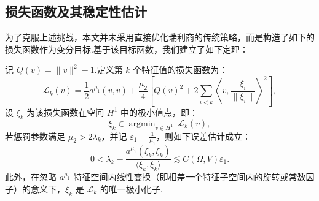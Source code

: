 \subsection{损失函数及其稳定性估计}
为了克服上述挑战，本文并未采用直接优化瑞利商的传统策略，而是构造了如下的损失函数作为变分目标.基于该目标函数，我们建立了如下定理：

\begin{theorem}\label{th:3.1}
记 $Q(v)=\|v\|^{2}-1$.定义第 $k$ 个特征值的损失函数为：
\begin{equation}\label{eq:conloss}
\mathcal{L}_{k}(v)=\frac{1}{2}a^{\mu_{1}}(v,v)+\frac{\mu_{2}}{4}\left[Q(v)^{2}+2\sum_{i<k}\left\langle v,\frac{\xi_{i}}{\|\xi_{i}\|}\right\rangle^{2}\right],
\end{equation}
设 $\xi_{k}$ 为该损失函数在空间 $H^1$ 中的极小值点，即：
\begin{equation*}
\xi_{k}\in \mathop{\text{argmin}}_{v\in H^{1}}\ \mathcal{L}_{k}(v),
\end{equation*}
若惩罚参数满足 $\mu_{2}>2\lambda_{k}$，并记 $\varepsilon_1=\frac{1}{\mu_1}$，则如下误差估计成立：
\begin{equation*}
0<\lambda_{k}-\frac{a^{\mu_{1}}(\xi_{k},\xi_{k})}{\langle \xi_{k},\xi_{k}\rangle}\lesssim C(\Omega,V)\varepsilon_1.
\end{equation*}
此外，在忽略 $a^{\mu_{1}}$ 特征空间内线性变换（即相差一个特征子空间内的旋转或常数因子）的意义下，$\xi_{k}$ 是 $\mathcal{L}_{k}$ 的唯一极小化子.
\end{theorem}

